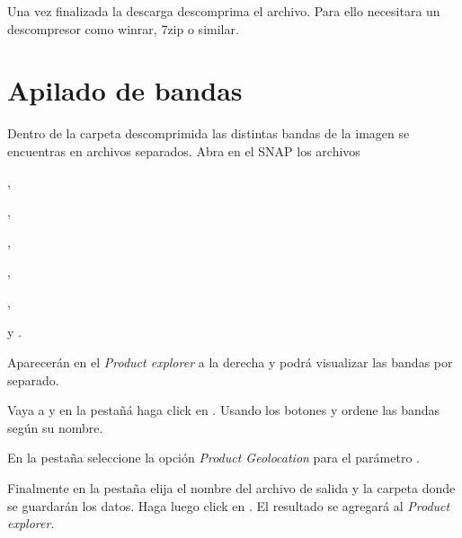 Una vez finalizada la descarga descomprima el archivo. Para ello necesitara un descompresor como winrar, 7zip o similar.

\section{Apilado de bandas}
Dentro de la carpeta descomprimida las distintas bandas de la imagen se encuentras en archivos separados. Abra en el SNAP los archivos

\begin{center} ,
\end{center}
\begin{center} ,
\end{center}
\begin{center} ,
\end{center}
\begin{center} ,
\end{center}
\begin{center} ,
\end{center}
\begin{center} 
\end{center}
\begin{center} y .
\end{center}

Aparecerán en el \emph{Product explorer} a la derecha y podrá visualizar las bandas por separado.

Vaya a  y en la pestañá  haga click en . Usando los botones  y  ordene las bandas según su nombre.

En la pestaña  seleccione la opción \emph{Product Geolocation} para el parámetro .

Finalmente en la pestaña  elija el nombre del archivo de salida y la carpeta donde se guardarán los datos. Haga luego click en . El resultado se agregará al \emph{Product explorer}.

